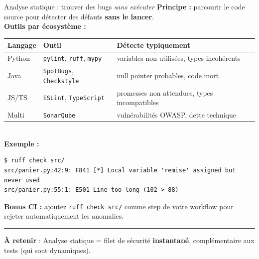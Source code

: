 \documentclass[aspectratio=169,11pt]{beamer}
\newcommand{\takeaway}[1]{%
\vfill\begin{beamercolorbox}[wd=\linewidth,sep=0.4em]{}
\color{accent2}\rule[0.6ex]{1.2em}{1.2pt}\hspace{0.4em}%
\textbf{\color{accent2}\small À retenir} \textcolor{textsoft}{:} %
{\small\color{textmain}#1}
\end{beamercolorbox}}
\begin{document}
\begin{frame}[fragile,t,shrink=10]{Analyse statique : trouver des bugs \emph{sans exécuter}}
\footnotesize
\textbf{Principe :} parcourir le code source pour détecter des défauts \textbf{sans le lancer}.\\[0.4em]

\textbf{Outils par écosystème :}
\begin{tabular}{@{}p{2.6cm} p{4.6cm} p{7.3cm}@{}}
\toprule
\textbf{Langage} & \textbf{Outil} & \textbf{Détecte typiquement} \\
\midrule
Python & \texttt{pylint}, \texttt{ruff}, \texttt{mypy} & variables non utilisées, types incohérents \\
Java & \texttt{SpotBugs}, \texttt{Checkstyle} & null pointer probables, code mort \\
JS/TS & \texttt{ESLint}, \texttt{TypeScript} & promesses non attendues, types incompatibles \\
Multi & \texttt{SonarQube} & vulnérabilités OWASP, dette technique \\
\bottomrule
\end{tabular}
\\
\vspace{0.5cm}
\textbf{Exemple :}
\begin{lstlisting}[style=bashdark]
$ ruff check src/
src/panier.py:42:9: F841 [*] Local variable 'remise' assigned but never used
src/panier.py:55:1: E501 Line too long (102 > 88)
\end{lstlisting}
\textbf{Bonus CI :} ajoutez \texttt{ruff check src/} comme step de votre workflow pour rejeter automatiquement les anomalies.
\takeaway{Analyse statique = filet de sécurité \textbf{instantané}, complémentaire aux tests (qui sont dynamiques).}
\end{frame}
\end{document}
